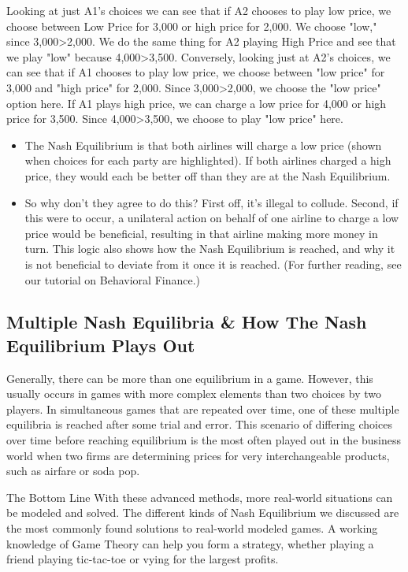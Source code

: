 \documentclass[a4paper,12pt]{article}
\begin{document}
Looking at just A1's choices we can see that if A2 chooses to play low price, we choose between Low Price for 3,000 or high price for 2,000. We choose "low," since 3,000>2,000. We do the same thing for A2 playing High Price and see that we play "low" because 4,000>3,500. Conversely, looking just at A2's choices, we can see that if A1 chooses to play low price, we choose between "low price" for 3,000 and "high price" for 2,000. Since 3,000>2,000, we choose the "low price" option here. If A1 plays high price, we can charge a low price for 4,000 or high price for 3,500. Since 4,000>3,500, we choose to play "low price" here.

\begin{itemize}
	\item The Nash Equilibrium is that both airlines will charge a low price (shown when choices for each party are highlighted). If both airlines charged a high price, they would each be better off than they are at the Nash Equilibrium.
	
\item So why don't they agree to do this? First off, it's illegal to collude. Second, if this were to occur, a unilateral action on behalf of one airline to charge a low price would be beneficial, resulting in that airline making more money in turn. This logic also shows how the Nash Equilibrium is reached, and why it is not beneficial to deviate from it once it is reached. (For further reading, see our tutorial on Behavioral Finance.)
\end{itemize}


\subsection{Multiple Nash Equilibria \& How The Nash Equilibrium Plays Out}
Generally, there can be more than one equilibrium in a game. However, this usually occurs in games with more complex elements than two choices by two players. In simultaneous games that are repeated over time, one of these multiple equilibria is reached after some trial and error. This scenario of differing choices over time before reaching equilibrium is the most often played out in the business world when two firms are determining prices for very interchangeable products, such as airfare or soda pop.

The Bottom Line
With these advanced methods, more real-world situations can be modeled and solved. The different kinds of Nash Equilibrium we discussed are the most commonly found solutions to real-world modeled games. A working knowledge of Game Theory can help you form a strategy, whether playing a friend playing tic-tac-toe or vying for the largest profits.
\end{document}
